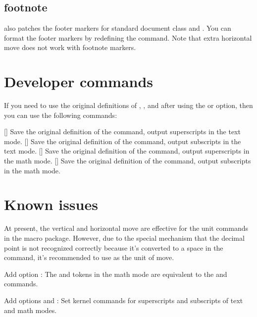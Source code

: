 \documentclass[load-preamble+]{cnltx-doc}
\begin{document}
\subsection{footnote}
 also patches the footer markers for standard document class and . You can format the footer markers by redefining the  command. Note that extra horizontal move does not work with footnote markers.

\section{Developer commands}
If you need to use the original definitions of , ,  and  after using the  or  option, then you can use the following commands:
\begin{commands}
  []
  Save the original definition of the  command, output superscripts in the text mode.
  []
  Save the original definition of the  command, output subscripts in the text mode.
  []
  Save the original definition of the  command, output superscripts in the math mode.
  []
  Save the original definition of the  command, output subscripts in the math mode.
\end{commands}

\section{Known issues}
At present, the vertical and horizontal move are effective for the unit commands in the  macro package. However, due to the special mechanism that the decimal point is not recognized correctly because it's converted to a space in the  command, it's recommended to use  as the unit of move.

\appendix
\begin{changelog}[simple]
  \begin{version}[v = 1.46j,date = 2024/05/19]
  \item Add option : The \code{\^{}} and \code{\_{}} tokens in the math mode are equivalent to the  and  commands.
  \end{version}
  \begin{version}[v = 1.46k,date = 2024/06/21]
  \item Add options  and : Set kernel commands for superscripts and subscripts of text and math modes.
  \end{version}
\end{changelog}
\nocite{*}
\end{document}
